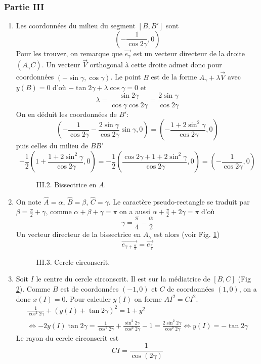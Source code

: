 \subsubsection*{Partie III}
\begin{enumerate}
\item Les coordonnées du milieu du segment $[B,B']$ sont
\[\left( -\frac{1}{\cos 2\gamma},0\right)\]
Pour les trouver, on remarque que $\overrightarrow{e_\gamma}$ est un vecteur directeur de la droite $(A_\gamma C)$. Un vecteur $\overrightarrow{V}$ orthogonal à cette droite admet donc pour coordonnées $(-\sin \gamma , \cos \gamma)$. Le point $B$ est de la forme $A_\gamma + \lambda \overrightarrow{V}$ avec $y(B)=0$ d'où $-\tan 2 \gamma + \lambda \cos \gamma =0$ et 
\[\lambda=\frac{\sin 2\gamma}{\cos \gamma \cos 2\gamma}=\frac{2\sin \gamma}{\cos 2 \gamma}\] 
On en déduit les coordonnées de $B'$:
\[
\left( -\frac{1}{\cos 2\gamma} -\frac{2\sin \gamma}{\cos 2 \gamma}\sin \gamma ,0\right) = \left(-\frac{1+2\sin^2\gamma}{\cos 2\gamma},0 \right) 
\]
puis celles du milieu de $BB'$
\[-\frac{1}{2}\left(1+\frac{1+2\sin^2\gamma}{\cos 2\gamma},0 \right) = 
 -\frac{1}{2}\left(\frac{\cos 2\gamma +1+2\sin^2\gamma}{\cos2\gamma},0\right) =
\left( -\frac{1}{\cos 2\gamma},0 \right) \]

\begin{figure}
	\begin{center}
	
	\end{center}
\caption{III.2. Bissectrice en $A$.}
\label{fig:Cpseudorec_3}
\end{figure} 
\item On note $\widehat{A}=\alpha$, $\widehat{B}=\beta$, $\widehat{C}=\gamma$. Le caractère pseudo-rectangle se traduit par $\beta=\frac{\pi}{2}+\gamma$, comme $\alpha +\beta +\gamma=\pi$ on a aussi $\alpha + \frac{\pi}{2}+2\gamma=\pi$ d'où
\[\gamma=\frac{\pi}{4}-\frac{\alpha}{2}\]
Un vecteur directeur de la bissectrice en $A_\gamma$ est alors (voir Fig. \ref{fig:Cpseudorec_3})
\[\overrightarrow{e_{\gamma + \frac{\alpha}{2}}}=\overrightarrow{e_{\frac{\pi}{4}}}\]

\begin{figure}
	\begin{center}
	
	\end{center}
\caption{III.3. Cercle circonscrit.}
\label{fig:Cpseudorec_4}
\end{figure} 
\item Soit $I$ le centre du cercle circonscrit. Il est sur la médiatrice de $[B,C]$ (Fig \ref{fig:Cpseudorec_4}). Comme $B$ est de coordonnées $(-1,0)$ et $C$ de coordonnées $(1,0)$, on a donc $x(I)=0$. Pour calculer $y(I)$ on forme $AI^2=CI^2$.
\begin{multline*}
\frac{1}{\cos^2 2\gamma}+(y(I)+\tan 2\gamma)^2 = 1+y^2 \\ \Leftrightarrow 
-2y(I)\tan 2\gamma =\frac{1}{\cos^2 2\gamma}+\frac{\sin^2 2\gamma}{\cos^2 2\gamma}-1 
= \frac{2\sin ^2 2\gamma}{\cos^2 2\gamma} \Leftrightarrow
y(I)=-\tan 2\gamma
\end{multline*}
Le rayon du cercle circonscrit est 
\begin{displaymath}
 CI = \frac{1}{\cos(2\gamma)}
\end{displaymath}


\end{enumerate}
